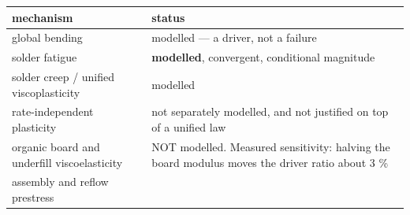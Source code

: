 \documentclass[10pt,]{article}
\begin{document}
\begin{longtable}[]{@{}ll@{}}
\toprule
\begin{minipage}[b]{0.47\columnwidth}\raggedright
mechanism\strut
\end{minipage} & \begin{minipage}[b]{0.47\columnwidth}\raggedright
status\strut
\end{minipage}\tabularnewline
\midrule
\endhead
\begin{minipage}[t]{0.47\columnwidth}\raggedright
global bending\strut
\end{minipage} & \begin{minipage}[t]{0.47\columnwidth}\raggedright
modelled --- a driver, not a failure\strut
\end{minipage}\tabularnewline
\begin{minipage}[t]{0.47\columnwidth}\raggedright
solder fatigue\strut
\end{minipage} & \begin{minipage}[t]{0.47\columnwidth}\raggedright
\textbf{modelled}, convergent, conditional magnitude\strut
\end{minipage}\tabularnewline
\begin{minipage}[t]{0.47\columnwidth}\raggedright
solder creep / unified viscoplasticity\strut
\end{minipage} & \begin{minipage}[t]{0.47\columnwidth}\raggedright
modelled\strut
\end{minipage}\tabularnewline
\begin{minipage}[t]{0.47\columnwidth}\raggedright
rate-independent plasticity\strut
\end{minipage} & \begin{minipage}[t]{0.47\columnwidth}\raggedright
not separately modelled, and not justified on top of a unified law\strut
\end{minipage}\tabularnewline
\begin{minipage}[t]{0.47\columnwidth}\raggedright
organic board and underfill viscoelasticity\strut
\end{minipage} & \begin{minipage}[t]{0.47\columnwidth}\raggedright
NOT modelled. Measured sensitivity: halving the board modulus moves the
driver ratio about 3 \%\strut
\end{minipage}\tabularnewline
\begin{minipage}[t]{0.47\columnwidth}\raggedright
assembly and reflow prestress\strut
\end{minipage} & \begin{minipage}[t]{0.47\columnwidth}\raggedright

\end{minipage}
\end{longtable}
\end{document}
